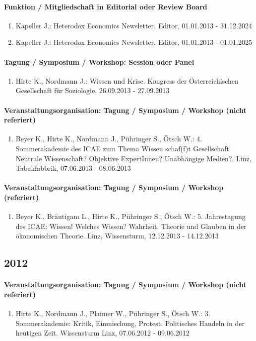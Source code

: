 \paragraph{Funktion / Mitgliedschaft in Editorial oder Review Board}
\begin{enumerate}[leftmargin=*, labelsep=0.5cm]
\item Kapeller J.: Heterodox Economics Newsletter. Editor, 01.01.2013 - 31.12.2024
\item Kapeller J.: Heterodox Economics Newsletter. Editor, 01.01.2013 - 01.01.2025
\end{enumerate}
\paragraph{Tagung / Symposium / Workshop: Session oder Panel}
\begin{enumerate}[leftmargin=*, labelsep=0.5cm]
\item Hirte K., Nordmann J.: Wissen und Krise. Kongress der Österreichischen Gesellschaft für Soziologie, 26.09.2013 - 27.09.2013
\end{enumerate}
\paragraph{Veranstaltungsorganisation: Tagung / Symposium / Workshop (nicht referiert)}
\begin{enumerate}[leftmargin=*, labelsep=0.5cm]
\item Beyer K., Hirte K., Nordmann J., Pühringer S., Ötsch W.: 4. Sommerakademie des ICAE zum Thema  	  Wissen schaf(f)t Gesellschaft. Neutrale Wissenschaft? Objektive ExpertInnen? Unabhängige Medien?. Linz, Tabakfabbrik, 07.06.2013 - 08.06.2013
\end{enumerate}
\paragraph{Veranstaltungsorganisation: Tagung / Symposium / Workshop (referiert)}
\begin{enumerate}[leftmargin=*, labelsep=0.5cm]
\item Beyer K., Bräutigam L., Hirte K., Pühringer S., Ötsch W.: 5. Jahrestagung des ICAE: Wissen! Welches Wissen? Wahrheit, Theorie und Glauben in der ökonomischen Theorie. Linz, Wissensturm, 12.12.2013 - 14.12.2013
\end{enumerate}\subsection*{2012}\paragraph{Veranstaltungsorganisation: Tagung / Symposium / Workshop (nicht referiert)}
\begin{enumerate}[leftmargin=*, labelsep=0.5cm]
\item Hirte K., Nordmann J., Plaimer W., Pühringer S., Ötsch W.: 3. Sommerakademie: Kritik, Einmischung, Protest. Politisches Handeln in der heutigen Zeit. Wissensturm Linz, 07.06.2012 - 09.06.2012
\end{enumerate}
